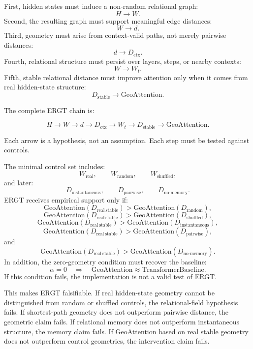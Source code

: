 \documentclass[11pt]{article}
\begin{document}
First, hidden states must induce a non-random relational graph:
\[
H
\rightarrow
W.
\]
Second, the resulting graph must support meaningful edge distances:
\[
W
\rightarrow
d.
\]
Third, geometry must arise from context-valid paths, not merely pairwise distances:
\[
d
\rightarrow
D_{\mathrm{ctx}}.
\]
Fourth, relational structure must persist over layers, steps, or nearby contexts:
\[
W
\rightarrow
W_t.
\]
Fifth, stable relational distance must improve attention only when it comes from real hidden-state structure:
\[
D_{\mathrm{stable}}
\rightarrow
\mathrm{GeoAttention}.
\]

The complete ERGT chain is:
\begin{ergtclaim}
\[
H \rightarrow W \rightarrow d \rightarrow D_{\mathrm{ctx}} \rightarrow W_t \rightarrow D_{\mathrm{stable}} \rightarrow \mathrm{GeoAttention}.
\]
\end{ergtclaim}
Each arrow is a hypothesis, not an assumption. Each step must be tested against controls.

The minimal control set includes:
\[
W_{\mathrm{real}},
\qquad
W_{\mathrm{random}},
\qquad
W_{\mathrm{shuffled}},
\]
and later:
\[
D_{\mathrm{instantaneous}},
\qquad
D_{\mathrm{pairwise}},
\qquad
D_{\mathrm{no\text{-}memory}}.
\]
ERGT receives empirical support only if:
\[
\mathrm{GeoAttention}(D_{\mathrm{real\ stable}})
>
\mathrm{GeoAttention}(D_{\mathrm{random}}),
\]
\[
\mathrm{GeoAttention}(D_{\mathrm{real\ stable}})
>
\mathrm{GeoAttention}(D_{\mathrm{shuffled}}),
\]
\[
\mathrm{GeoAttention}(D_{\mathrm{real\ stable}})
>
\mathrm{GeoAttention}(D_{\mathrm{instantaneous}}),
\]
\[
\mathrm{GeoAttention}(D_{\mathrm{real\ stable}})
>
\mathrm{GeoAttention}(D_{\mathrm{pairwise}}),
\]
and
\[
\mathrm{GeoAttention}(D_{\mathrm{real\ stable}})
>
\mathrm{GeoAttention}(D_{\mathrm{no\text{-}memory}}).
\]
In addition, the zero-geometry condition must recover the baseline:
\[
\alpha=0
\quad\Rightarrow\quad
\mathrm{GeoAttention}
\approx
\mathrm{TransformerBaseline}.
\]
If this condition fails, the implementation is not a valid test of ERGT.

This makes ERGT falsifiable. If real hidden-state geometry cannot be distinguished from random or shuffled controls, the relational-field hypothesis fails. If shortest-path geometry does not outperform pairwise distance, the geometric claim fails. If relational memory does not outperform instantaneous structure, the memory claim fails. If GeoAttention based on real stable geometry does not outperform control geometries, the intervention claim fails.
\end{document}
